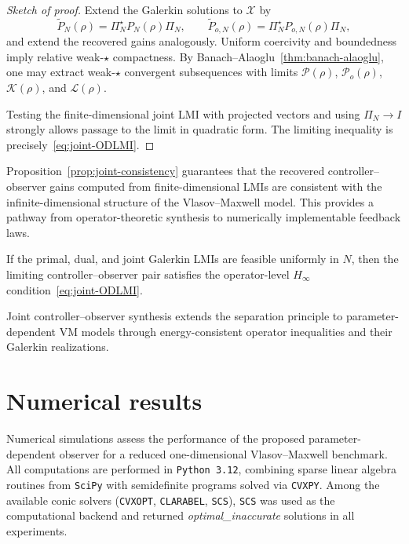 \documentclass[AMA,Times2COL]{WileyNJDv5}
\begin{document}
\begin{proof}[Sketch of proof]
Extend the Galerkin solutions to $\mathscr X$ by
\[
\widetilde P_N(\rho)=\Pi_N^\star P_N(\rho)\Pi_N,
\qquad
\widetilde P_{o,N}(\rho)=\Pi_N^\star P_{o,N}(\rho)\Pi_N,
\]
and extend the recovered gains analogously. Uniform coercivity and boundedness imply relative weak-$\star$ compactness. By Banach--Alaoglu~\ref{thm:banach-alaoglu}, one may extract weak-$\star$ convergent subsequences with limits $\mathcal P(\rho)$, $\mathcal P_o(\rho)$, $\mathcal K(\rho)$, and $\mathcal L(\rho)$.

Testing the finite-dimensional joint LMI with projected vectors and using $\Pi_N\to I$ strongly allows passage to the limit in quadratic form. The limiting inequality is precisely~\eqref{eq:joint-ODLMI}.
\end{proof}

Proposition~\ref{prop:joint-consistency} guarantees that the recovered controller--observer gains computed from finite-dimensional LMIs are consistent with the infinite-dimensional structure of the Vlasov--Maxwell model. This provides a pathway from operator-theoretic synthesis to
numerically implementable feedback laws.

\begin{corollary}\label{cor:joint-galerkin}
If the primal, dual, and joint Galerkin LMIs are feasible uniformly in $N$, then the limiting controller--observer pair satisfies the operator-level $H_\infty$ condition~\eqref{eq:joint-ODLMI}.
\end{corollary}

Joint controller--observer synthesis extends the separation principle to parameter-dependent VM models through energy-consistent operator inequalities and their Galerkin realizations.

\section{Numerical results} \label{sec:numerical}

Numerical simulations assess the performance of the proposed parameter-dependent observer for a reduced one-dimensional Vlasov--Maxwell benchmark. All computations are performed in \texttt{Python~3.12}, combining sparse linear algebra routines from \texttt{SciPy} with semidefinite programs solved via \texttt{CVXPY}. Among the
available conic solvers (\texttt{CVXOPT}, \texttt{CLARABEL}, \texttt{SCS}), \texttt{SCS} was used as the computational backend and returned \emph{optimal\_inaccurate} solutions in all experiments.
\end{document}
